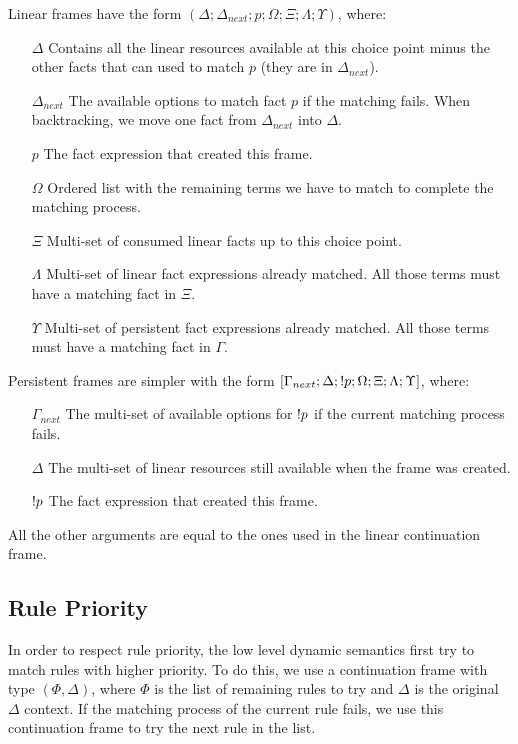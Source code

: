 Linear frames have the form $(\Delta; \Delta_{next}; p; \Omega; \Xi; \Lambda; \Upsilon)$, where:

\begin{enumerate}
   \item[$\Delta$] Contains all the linear resources available at this choice point minus the other facts that can used to match $p$ (they are in $\Delta_{next}$).
   \item[$\Delta_{next}$] The available options to match fact $p$ if the matching fails. When backtracking, we move one fact from $\Delta_{next}$ into $\Delta$.
   \item[$p$] The fact expression that created this frame.
   \item[$\Omega$] Ordered list with the remaining terms we have to match to complete the matching process.
   \item[$\Xi$] Multi-set of consumed linear facts up to this choice point.
   \item[$\Lambda$] Multi-set of linear fact expressions already matched. All those terms must have a matching fact in $\Xi$.
   \item[$\Upsilon$] Multi-set of persistent fact expressions already matched. All those terms must have a matching fact in $\Gamma$.
\end{enumerate}

Persistent frames are simpler with the form $[\Gamma_{next}; \Delta; {!} p; \Omega; \Xi; \Lambda; \Upsilon]$, where:

\begin{enumerate}
   \item[$\Gamma_{next}$] The multi-set of available options for ${!} p$ if the current matching process fails.
   \item[$\Delta$] The multi-set of linear resources still available when the frame was created.
   \item[${!} p$] The fact expression that created this frame.
\end{enumerate}

All the other arguments are equal to the ones used in the linear continuation frame.

\subsection{Rule Priority}

In order to respect rule priority, the low level dynamic semantics first try to match rules with
higher priority. To do this, we use a continuation frame with type $(\Phi, \Delta)$, where $\Phi$
is the list of remaining rules to try and $\Delta$ is the original $\Delta$ context. If the matching
process of the current rule fails, we use this continuation frame to try the next rule in the list.

